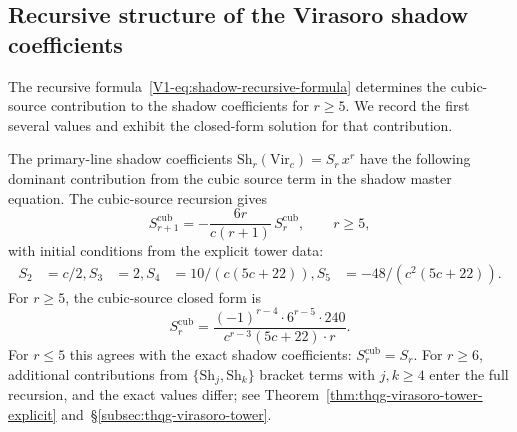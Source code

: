 
\subsection{Recursive structure of the Virasoro
shadow coefficients}

The recursive formula~\eqref{V1-eq:shadow-recursive-formula}
determines the cubic-source contribution to the shadow coefficients for
$r \geq 5$. We record the first several values and exhibit the
closed-form solution for that contribution.

\begin{proposition}
The primary-line shadow coefficients
$\mathrm{Sh}_r(\mathrm{Vir}_c) = S_r\,x^r$
have the following dominant contribution from
the cubic source term in the shadow master equation.
The cubic-source recursion gives
\begin{equation}%
S_{r+1}^{\mathrm{cub}} = -\frac{6r}{c(r+1)}\,S_r^{\mathrm{cub}},
\qquad r \geq 5,
\end{equation}
with initial conditions from the explicit tower data:
\begin{align}
S_2 &= c/2, %
S_3 &= 2, %
S_4 &= 10/(c(5c+22)), %
S_5 &= -48/(c^2(5c+22)). %
\end{align}
For $r \geq 5$, the cubic-source closed form is
\begin{equation}%
S_r^{\mathrm{cub}} =
\frac{(-1)^{r-4} \cdot 6^{r-5} \cdot 240}
{c^{r-3}(5c+22) \cdot r}.
\end{equation}
For $r \leq 5$ this agrees with the exact shadow
coefficients: $S_r^{\mathrm{cub}} = S_r$.
For $r \geq 6$, additional contributions from
$\{\mathrm{Sh}_j, \mathrm{Sh}_k\}$ bracket terms with
$j,k \geq 4$ enter the full recursion, and the exact
values differ; see
Theorem~\textup{\ref{thm:thqg-virasoro-tower-explicit}}
and~\S\textup{\ref{subsec:thqg-virasoro-tower}}.
\end{proposition}

